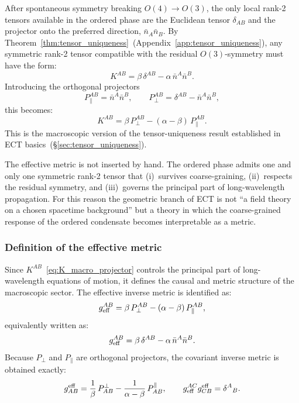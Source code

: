 After spontaneous symmetry breaking $O(4)\to O(3)$, the only local
rank-2 tensors available in the ordered phase are the Euclidean tensor
$\delta_{AB}$ and the projector onto the preferred direction,
$\bar{n}_A\bar{n}_B$.
By Theorem~\ref{thm:tensor_uniqueness}~(Appendix~\ref{app:tensor_uniqueness}),
any symmetric rank-2 tensor compatible with the residual $O(3)$-symmetry
must have the form:
\begin{equation}
  \label{eq:K_macro}
  K^{AB}
  = \beta\,\delta^{AB} - \alpha\,\bar{n}^A\bar{n}^B.
\end{equation}
Introducing the orthogonal projectors
\begin{equation}
  \label{eq:projectors_macro}
  P_\parallel^{AB} = \bar{n}^A\bar{n}^B,
  \qquad
  P_\perp^{AB} = \delta^{AB} - \bar{n}^A\bar{n}^B,
\end{equation}
this becomes:
\begin{equation}
  \label{eq:K_macro_projector}
  K^{AB}
  = \beta\,P_\perp^{AB} - (\alpha-\beta)\,P_\parallel^{AB}.
\end{equation}
This is the macroscopic version of the tensor-uniqueness result
established in ECT basics~(\S\ref{sec:tensor_uniqueness}).

The effective metric is not inserted by hand.
The ordered phase admits one and only one symmetric rank-2 tensor
that (i)~survives coarse-graining, (ii)~respects the residual symmetry,
and (iii)~governs the principal part of long-wavelength propagation.
For this reason the geometric branch of ECT is not ``a field theory on
a chosen spacetime background'' but a theory in which the coarse-grained
response of the ordered condensate becomes interpretable as a metric.

\subsubsection*{Definition of the effective metric}

Since $K^{AB}$~\eqref{eq:K_macro_projector} controls the principal
part of long-wavelength equations of motion, it defines the causal and
metric structure of the macroscopic sector.
The effective inverse metric is identified as:
\begin{equation}
  \label{eq:geff_contra}
  g_{\rm eff}^{AB}
  = \beta\,P_\perp^{AB} - (\alpha-\beta)\,P_\parallel^{AB},
\end{equation}
equivalently written as:
\begin{equation}
  \label{eq:geff_contra_alt}
  g_{\rm eff}^{AB}
  = \beta\,\delta^{AB} - \alpha\,\bar{n}^A\bar{n}^B.
\end{equation}
Because $P_\perp$ and $P_\parallel$ are orthogonal projectors,
the covariant inverse metric is obtained exactly:
\begin{equation}
  \label{eq:geff_cov}
  g^{\rm eff}_{AB}
  = \frac{1}{\beta}\,P^\perp_{AB}
  - \frac{1}{\alpha-\beta}\,P^\parallel_{AB},
  \qquad
  g_{\rm eff}^{AC}g^{\rm eff}_{CB} = \delta^A{}_B.
\end{equation}

